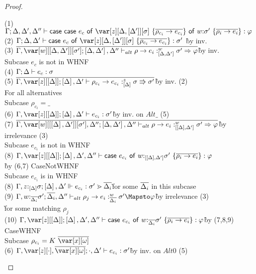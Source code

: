 
\caseofcasethm*

\begin{proof}~
\begin{tabbing}
    (1) $\G; \D, \D', \D'' \vdash \ccase{\ccase{e_c}{\zD~\{\ov{\rho_{c_i} \to e_{c_i}}\}}}{w{:}\s'~\{\ov{\rho_i \to e_i}\}} : \vp$\\
    (2) $\G; \D, \D' \vdash \ccase{e_c}{\zD~\{\ov{\rho_{c_i} \to e_{c_i}}\}} : \s'$ \`by inv.\\
    (3) $\ov{\G, \var[w][\irr{\D,\D'}][\s']; \irr{\D,\D'},\D'' \vdash_{alt} \rho \to e_i :^w_{\irr{\D,\D'}} \s' \Rightarrow \vp}$\`by inv.\\
    Subcase $e_c$ is not in WHNF\\
    (4) $\Gamma;\Delta \vdash e_c : \sigma$\\
    (5) $\ov{\G,\var[z][\irr{\D}]; \irr{\D}, \D' \vdash \rho_{c_i} \to e_{c_i} :^z_{\irr{\D}} \s \Rrightarrow \s'}$\`by inv. (2)\\
    For all alternatives\\
    Subcase $\rho_{c_i} = \_$\\
    (6) $\G,\var[z][\irr{\D}]; \irr{\D}, \D' \vdash e_{c_i} : \s'$\`by inv. on $Alt\_$ (5)\\
    (7) $\ov{\G, \var[w][\irr{\irr{\D},\D'}][\s'],\D''; \irr{\D,\D'},\D'' \vdash_{alt} \rho \to e_i :^w_{\irr{\irr{\D},\D'}} \s' \Rightarrow \vp}$\`by irrelevance (3)\\
    Subcase $e_{c_i}$ is not in WHNF\\
    (8) $\G,\var[z][\irr{\D}]; \irr{\D},\D',\D'' \vdash \ccase{e_{c_i}}{w{:}_{\irr{\irr{\D},\D'}}\s'~\{\ov{\rho_i \to e_i}\}} : \vp$\\\`by (6,7) CaseNotWHNF\\
    Subcase $e_{c_i}$ is in WHNF\\
    (8) $\Gamma,z{:}_{\left[\Delta\right]}\sigma; \left[\Delta\right],\Delta' \Vdash e_{c_i} : \sigma' \gtrdot \overline{\Delta_i}$\`for some $\overline{\Delta_i}$ in this subcase\\
    (9) $\G, w{:}_{\ov{\D_i}}\s'; \ov{\D_i}, \D'' \vdash_{alt} \rho_j \to e_i :^w_{\ov{\D_i}} \s' \Mapsto \vp$\`by irrelevance (3)\\\` for some matching $\rho_j$\\
    (10) $\G, \z[\irr{\D}]; \irr{\D},\D',\D'' \vdash \ccase{e_{c_i}}{w{:}_{\ov{\D_i}}\s'~\{\ov{\rho_i \to e_i}\}} : \vp$\` by (7,8,9) CaseWHNF\\
    Subcase $\rho_{c_i} = K~\ov{\xo}$\\
    (6) $\G,\z[\cdot], \ov{\xo} ; \cdot, \D' \vdash e_{c_i} : \s'$\`by inv. on $Alt0$ (5)\\

\end{tabbing}
\end{proof}
